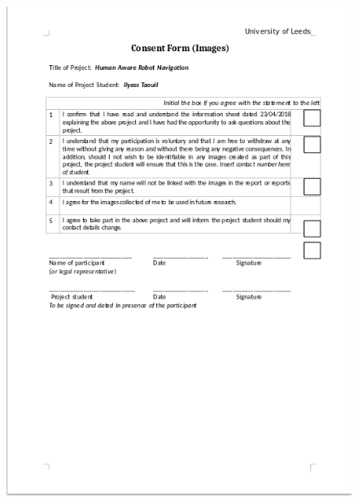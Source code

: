 \begin{appendices}
\begin{figure}[H]
  \begin{center}
    \includegraphics[width=.9\linewidth]{images/appendix_consent_form.png}
  \end{center}
\end{figure}

\end{appendices}
